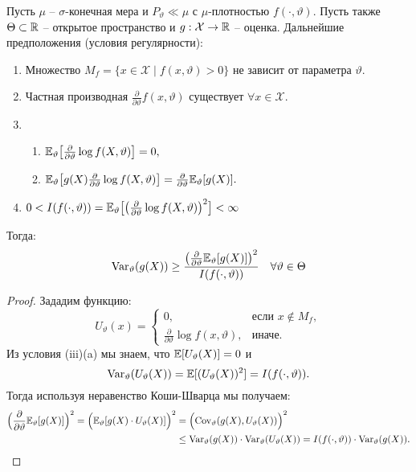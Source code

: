 \begin{thm} \label{Cramer-Rao inequality} 
	Пусть $\mu$ -- $\sigma$-конечная мера и $P_\vartheta \ll \mu$ с $\mu$-плотностью $f(\cdot, \vartheta)$. Пусть также $\Theta \subset \mathbb{R}$ -- открытое пространство и $g:\mathcal{X} \rightarrow \mathbb{R}$ -- оценка.
	Дальнейшие предположения (условия регулярности):
	\begin{enumerate}
		\item Множество $M_f=\{ x \in \mathcal{X} \mid f(x, \vartheta) > 0 \}$ не зависит от параметра $\vartheta$.
		\item Частная производная $ \frac{\partial}{\partial \vartheta} f(x, \vartheta)$ существует $\forall x \in \mathcal{X}$.
		\item 
		\begin{enumerate}
		\item $\mathbb{E}_\vartheta \big[\frac{\partial}{\partial \vartheta} \log f(X, \vartheta)\big] = 0,$
		\item $\mathbb{E}_\vartheta \big[g(X) \frac{\partial}{\partial \vartheta} \log f(X, \vartheta)\big] = \frac{\partial}{\partial \vartheta} \mathbb{E}_\vartheta[g(X)].$
	    \end{enumerate}
		\item $0<I(f(\cdot, \vartheta))=\mathbb{E}_\vartheta \big[\big(\frac{\partial}{\partial \vartheta} \log f(X, \vartheta)\big)^2\big]<\infty$
	\end{enumerate}
	Тогда:
	\begin{equation} \label{eq2.2}
	\mathrm{Var}_\vartheta(g(X)) \geq \frac{\big(\frac{\partial}{\partial \vartheta} \mathbb{E}_\vartheta[g(X)]\big)^2}{I(f(\cdot, \vartheta))} \quad \forall \vartheta \in \Theta
	\end{equation}
\end{thm}
\begin{proof}
	Зададим функцию:
	\[ U_\vartheta(x)=
	\left\{
	\begin{array}{ll}
	0, & \text{если } x \notin M_f, \\
	\frac{\partial}{\partial \vartheta} \log f(x, \vartheta), & \text{иначе.}
	\end{array}
	\right.
	\]
	Из условия (iii)(a) мы знаем, что $\mathbb{E}[U_\vartheta(X)]=0$ и
	\[ \mathrm{Var}_\vartheta(U_\vartheta(X))=\mathbb{E}[(U_\vartheta(X))^2]=I(f(\cdot, \vartheta)). \]
	Тогда используя неравенство Коши-Шварца мы получаем:
	\[
	\begin{aligned}
	\Big( \frac{\partial}{\partial \vartheta} \mathbb{E}_\vartheta[g(X)] \Big)^2 = \Big( \mathbb{E}_\vartheta[g(X) \cdot U_\vartheta(X)] \Big)^2  & = \Big(\mathrm{Cov}_\vartheta(g(X), U_\vartheta(X)) \Big)^2 \\
	& \leq \mathrm{Var}_\vartheta(g(X))\cdot \mathrm{Var}_\vartheta(U_\vartheta(X))=
	I(f(\cdot, \vartheta))\cdot \mathrm{Var}_\vartheta(g(X)).
	\end{aligned}
	  \]
\end{proof}

